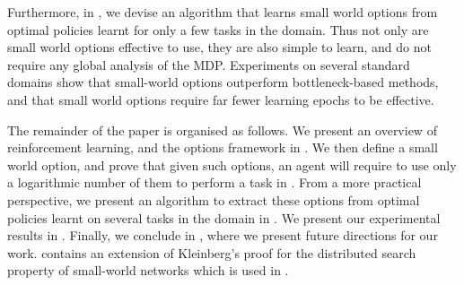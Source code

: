 Furthermore, in , we devise an algorithm that learns
small world options from optimal policies learnt for only a few tasks in
the domain. Thus not only are small world options effective to use, they
are also simple to learn, and do not require any global analysis of the
MDP. Experiments on several standard domains show that small-world
options outperform bottleneck-based methods, and that small world
options require far fewer learning epochs to be effective.

The remainder of the paper is organised as follows. We present an
overview of reinforcement learning, and the options framework in
. We then define a small world option, and prove
that given such options, an agent will require to use only a logarithmic
number of them to perform a task in . From a more
practical perspective, we present an algorithm to extract these options
from optimal policies learnt on several tasks in the domain in
. We present our experimental results in
. Finally, we conclude in
, where we present future directions for our
work.  contains an extension of
Kleinberg's proof for the distributed search property of small-world
networks which is used in .

